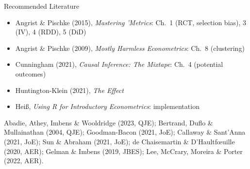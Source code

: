 \documentclass[9pt,aspectratio=169]{beamer}
\begin{document}
\begin{frame}{Recommended Literature}
\linespread{1.2}\selectfont
  \begin{itemize}
    \item Angrist \& Pischke (2015), \emph{Mastering 'Metrics}: Ch.\ 1 (RCT, selection bias), 3 (IV), 4 (RDD), 5 (DiD)
    \item Angrist \& Pischke (2009), \emph{Mostly Harmless Econometrics}: Ch.\ 8 (clustering)
    \item Cunningham (2021), \emph{Causal Inference: The Mixtape}: Ch.\ 4 (potential outcomes)
    \item Huntington-Klein (2021), \emph{The Effect}
    \item Heiß, \emph{Using R for Introductory Econometrics}: implementation
  \end{itemize}
  \medskip
  Abadie, Athey, Imbens \& Wooldridge (2023, QJE); Bertrand, Duflo \& Mullainathan (2004, QJE); Goodman-Bacon (2021, JoE); Callaway \& Sant'Anna (2021, JoE); Sun \& Abraham (2021, JoE); de Chaisemartin \& D'Haultf{\oe}uille (2020, AER); Gelman \& Imbens (2019, JBES); Lee, McCrary, Moreira \& Porter (2022, AER).
\end{frame}
\end{document}
